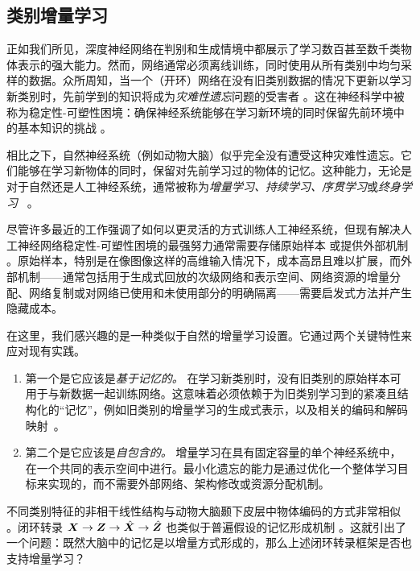 \documentclass[../../book-main.tex]{subfiles}
\begin{document}
\subsection{类别增量学习}
\label{sec:class-wise-incremental}

正如我们所见，深度神经网络在判别和生成情境中都展示了学习数百甚至数千类物体表示的强大能力。然而，网络通常必须离线训练，同时使用从所有类别中均匀采样的数据。众所周知，当一个（开环）网络在没有旧类别数据的情况下更新以学习新类别时，先前学到的知识将成为{\em 灾难性遗忘}问题的受害者 \cite{McCloskey1989catastrophic}。这在神经科学中被称为稳定性-可塑性困境：确保神经系统能够在学习新环境的同时保留先前环境中的基本知识的挑战 \cite{Grossberg1987CompetitiveLF}。

相比之下，自然神经系统（例如动物大脑）似乎完全没有遭受这种灾难性遗忘。它们能够在学习新物体的同时，保留对先前学习过的物体的记忆。这种能力，无论是对于自然还是人工神经系统，通常被称为{\em 增量学习、持续学习、序贯学习}或{\em 终身学习}~ \cite{controlled-forgetting}。



尽管许多最近的工作强调了如何以更灵活的方式训练人工神经系统，但现有解决人工神经网络稳定性-可塑性困境的最强努力通常需要存储原始样本 \cite{icarl,chaudhry2019tiny} 或提供外部机制 \cite{EWC}。原始样本，特别是在像图像这样的高维输入情况下，成本高昂且难以扩展，而外部机制——通常包括用于生成式回放的次级网络和表示空间、网络资源的增量分配、网络复制或对网络已使用和未使用部分的明确隔离——需要启发式方法并产生隐藏成本。


在这里，我们感兴趣的是一种类似于自然的增量学习设置。它通过两个关键特性来应对现有实践。
\begin{enumerate}
    \item 第一个是它应该是\emph{基于记忆的。} 在学习新类别时，没有旧类别的原始样本可用于与新数据一起训练网络。这意味着必须依赖于为旧类别学习到的紧凑且结构化的“记忆”，例如旧类别的增量学习的生成式表示，以及相关的编码和解码映射~\cite{fearnet}。
    \item 第二个是它应该是\emph{自包含的。} 增量学习在具有固定容量的单个神经系统中，在一个共同的表示空间中进行。最小化遗忘的能力是通过优化一个整体学习目标来实现的，而不需要外部网络、架构修改或资源分配机制。
\end{enumerate}

不同类别特征的非相干线性结构与动物大脑颞下皮层中物体编码的方式非常相似 \cite{Chang-Cell-2017,Bao2020AMO}。闭环转录 $\bm{X} \rightarrow \bm{Z} \rightarrow \hat{\bm{X}} \rightarrow \hat{\bm{Z}}$ 也类似于普遍假设的记忆形成机制 \cite{2020Vandeven,Josselyn2020MemoryER}。这就引出了一个问题：既然大脑中的记忆是以增量方式形成的，那么上述闭环转录框架是否也支持增量学习？
\end{document}
